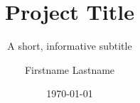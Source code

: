
\documentclass[english,11pt]{kth-document}


\title{Project Title}
\subtitle{A short, informative subtitle}
\author{Firstname Lastname}
\date{\today}


\newcommand{\swatch}[1]{%
  {\setlength{\fboxsep}{0pt}\setlength{\fboxrule}{0.4pt}%
   \fbox{\colorbox{#1}{\rule{0pt}{0.9em}\hspace{2.2em}}}}%
}



